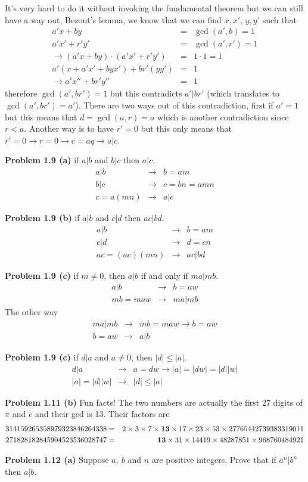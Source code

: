 \documentclass[aps,preprint,preprintnumbers,nofootinbib,showpacs,prd]{revtex4-1}
\newcommand{\nbea}{\begin{eqnarray*}}
\newcommand{\neea}{\end{eqnarray*}}
\begin{document}
It's very hard to do it without invoking the fundamental theorem but we can still have a way out, Bezout's lemma, we know that we can find $x, x'$, $y, y'$ such that
%
\nbea
a'x + by & = & \gcd(a',b) = 1 \\
a'x' + r'y' & = & \gcd(a',r') = 1 \\
\to (a'x + by)\cdot(a'x' + r'y') & = & 1 \cdot 1 = 1 \\
a'(x + a'x' + byx') + br'(yy') & = & 1 \\
\to a' x'' + br' y'' & = & 1
\neea
%
therefore $\gcd(a',br') = 1$ but this contradicts $a'|br'$ (which translates to $\gcd(a',br') = a'$). There are two ways out of this contradiction, first if $a' = 1$ but this means that $d = \gcd(a,r) = a$ which is another contradiction since $r < a$. Another way is to have $r' = 0$ but this only means that $r' = 0 \to r = 0 \to c = aq \to a|c$.

{\bf Problem 1.9 (a)} if $a|b$ and $b|c$ then $a|c$.
%
\nbea
a|b & \to & b = a m \\
b|c & \to & c = b n = a mn \\
c = a(mn) & \to & a|c
\neea
%

{\bf Problem 1.9 (b)} if $a|b$ and $c|d$ then $ac|bd$.
%
\nbea
a|b & \to & b = a m \\
c|d & \to & d = c n \\
ac = (ac)(mn) & \to & ac|bd
\neea
%

{\bf Problem 1.9 (c)} if $m \neq 0$, then $a|b$ if and only if $ma|mb$.
%
\nbea
a|b & \to & b = a w \\
mb = ma w & \to & ma |mb
\neea
%
The other way
%
\nbea
ma|mb & \to & mb = ma w \to b = aw  \\
b = a w & \to & a | b
\neea
%

{\bf Problem 1.9 (c)} if $d | a$ and $a \neq 0$, then $|d| \le |a|$.
%
\nbea
d|a & \to & a = d w \to |a| = |d w| = |d| |w| \\
|a| = |d| |w| & \to & |d| \le |a|
\neea
%

{\bf Problem 1.11 (b)} Fun facts! The two numbers are actually the first 27 digits of $\pi$ and $e$ and their gcd is 13. Their factors are
%
\nbea
314159265358979323846264338 & = & 2 \times 3 \times 7 \times {\bf 13} \times 17 \times 23 \times 53 \times 27765442739383319011 \\
271828182845904523536028747 & = & {\bf 13} \times 31 \times 14419 \times 48287851 \times 968760484921
\neea
%

{\bf Problem 1.12 (a)} Suppose $a,~b$ and $n$ are positive integers. Prove that if $a^n | b^n$ then $a|b$.
\end{document}
